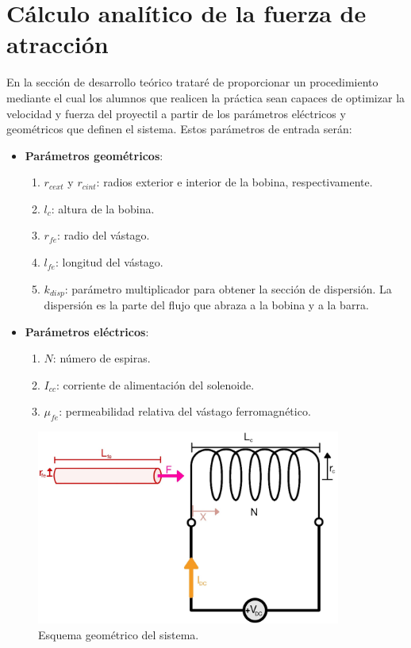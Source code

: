 \section{Cálculo analítico de la fuerza de atracción}
\label{sec:analitico}
En la sección de desarrollo teórico trataré de proporcionar un procedimiento mediante el cual los alumnos que realicen la práctica sean capaces de optimizar la velocidad y fuerza del proyectil a partir de los parámetros eléctricos y geométricos que definen el sistema. Estos parámetros de entrada serán:
\begin{itemize}
    \item \textbf{Parámetros geométricos}:
    \begin{enumerate}[label=\alph*., leftmargin=*, itemindent=1em]
        \item \(r_{cext}\) y \(r_{cint} \): radios exterior e interior de la bobina, respectivamente.
        \item \(l_c\): altura de la bobina.
        \item \(r_{fe}\): radio del vástago.
        \item \(l_{fe}\): longitud del vástago.
        \item \(k_{disp}\): parámetro multiplicador para obtener la sección de dispersión. La dispersión es la parte del flujo que abraza a la bobina y a la barra.
    \end{enumerate}
    \item \textbf{Parámetros eléctricos}:
    \begin{enumerate}[label=\alph*., leftmargin=*, itemindent=1em]
        \item \(N\): número de espiras.
        \item \(I_{cc}\): corriente de alimentación del solenoide.
        \item \(\mu_{fe}\): permeabilidad relativa del vástago ferromagnético.
    \end{enumerate}
\end{itemize}

\begin{figure}[H]
    \centering 
    \includegraphics[width=10cm]{FigurasMemoria/esquemaDesTeor.jpg}
    \caption{Esquema geométrico del sistema.}
    \label{fig:esquemaDesTeor} %
\end{figure}

